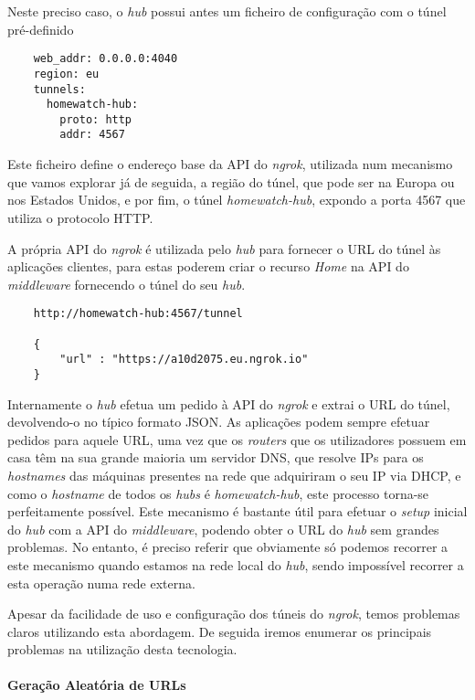 Neste preciso caso, o \textit{hub} possui antes um ficheiro de configuração com o túnel pré-definido

\begin{verbatim}
    web_addr: 0.0.0.0:4040
    region: eu
    tunnels:
      homewatch-hub:
        proto: http
        addr: 4567
\end{verbatim}

Este ficheiro define o endereço base da API do \textit{ngrok}, utilizada num mecanismo que vamos explorar já de seguida, a região do túnel, que pode ser na Europa ou nos Estados Unidos, e por fim, o túnel \textit{homewatch-hub}, expondo a porta 4567 que utiliza o protocolo HTTP.

A própria API do \textit{ngrok} é utilizada pelo \textit{hub} para fornecer o URL do túnel às aplicações clientes, para estas poderem criar o recurso \textit{Home} na API do \textit{middleware} fornecendo o túnel do seu \textit{hub}.

\begin{verbatim}
    http://homewatch-hub:4567/tunnel

    {
        "url" : "https://a10d2075.eu.ngrok.io"
    }
\end{verbatim}

Internamente o \textit{hub} efetua um pedido à API do \textit{ngrok} e extrai o URL do túnel, devolvendo-o no típico formato JSON. As aplicações podem sempre efetuar pedidos para aquele URL, uma vez que os \textit{routers} que os utilizadores possuem em casa têm na sua grande maioria um servidor DNS, que resolve IPs para os \textit{hostnames} das máquinas presentes na rede que adquiriram o seu IP via DHCP, e como o \textit{hostname} de todos os \textit{hubs} é \textit{homewatch-hub}, este processo torna-se perfeitamente possível. Este mecanismo é bastante útil para efetuar o \textit{setup} inicial do \textit{hub} com a API do \textit{middleware}, podendo obter o URL do \textit{hub} sem grandes problemas. No entanto, é preciso referir que obviamente só podemos recorrer a este mecanismo quando estamos na rede local do \textit{hub}, sendo impossível recorrer a esta operação numa rede externa.

Apesar da facilidade de uso e configuração dos túneis do \textit{ngrok}, temos problemas claros utilizando esta abordagem. De seguida iremos enumerar os principais problemas na utilização desta tecnologia.

\paragraph*{Geração Aleatória de URLs}

